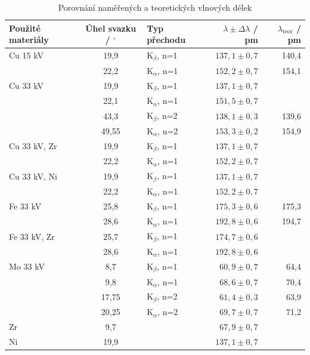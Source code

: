 \begin{table}[h!]
\centering
\caption{Porovnání naměřených a teoretických vlnových délek}
\begin{tabular}{l c l r r}
\hline\hline
Použité materiály & Úhel svazku / $^\circ$ & Typ přechodu & $\lambda \pm \Delta\lambda$ / pm & $\lambda_{\text{teor}}$ / pm \\
\hline
Cu 15 kV & 19,9 & K$_{\beta}$, n=1 & $137,1 \pm 0,7$ & 140,4 \\
         & 22,2 & K$_{\alpha}$, n=1 & $152,2 \pm 0,7$ & 154,1 \\
\hline
Cu 33 kV & 19,9 & K$_{\beta}$, n=1 & $137,1 \pm 0,7$ & \\
         & 22,1 & K$_{\alpha}$, n=1 & $151,5 \pm 0,7$ & \\
         & 43,3 & K$_{\beta}$, n=2 & $138,1 \pm 0,3$ & 139,6 \\ 
         & 49,55 & K$_{\alpha}$, n=2 & $153,3 \pm 0,2$ & 154,9 \\ 
\hline
Cu 33 kV, Zr & 19,9 & K$_{\beta}$, n=1 & $137,1 \pm 0,7$ & \\
             & 22,2 & K$_{\alpha}$, n=1 & $152,2 \pm 0,7$ & \\
\hline
Cu 33 kV, Ni & 19,9 & K$_{\beta}$, n=1 & $137,1 \pm 0,7$ & \\
             & 22,2 & K$_{\alpha}$, n=1 & $152,2 \pm 0,7$ & \\
\hline %
Fe 33 kV & 25,8 & K$_{\beta}$, n=1 & $175,3 \pm 0,6$ & 175,3 \\
         & 28,6 & K$_{\alpha}$, n=1 & $192,8 \pm 0,6$ & 194,7 \\
\hline
Fe 33 kV, Zr & 25,7 & K$_{\beta}$, n=1 & $174,7 \pm 0,6$ & \\
             & 28,6 & K$_{\alpha}$, n=1 & $192,8 \pm 0,6$ & \\
\hline %
Mo 33 kV & 8,7 & K$_{\beta}$, n=1 & $60,9 \pm 0,7$ & 64,4 \\
         & 9,8 & K$_{\alpha}$, n=1 & $68,6 \pm 0,7$ & 70,4 \\
         & 17,75 & K$_{\beta}$, n=2 & $61,4 \pm 0,3$ & 63,9 \\ 
         & 20,25 & K$_{\alpha}$, n=2 & $69,7 \pm 0,7$ & 71,2\\ 
\hline %
Zr       & 9,7 &                & $67,9 \pm 0,7$ & \\
\hline %
Ni       & 19,9 &                & $137,1 \pm 0,7$ & \\
\hline\hline
\end{tabular}
\label{tab:vlnove_delky}
\end{table}

